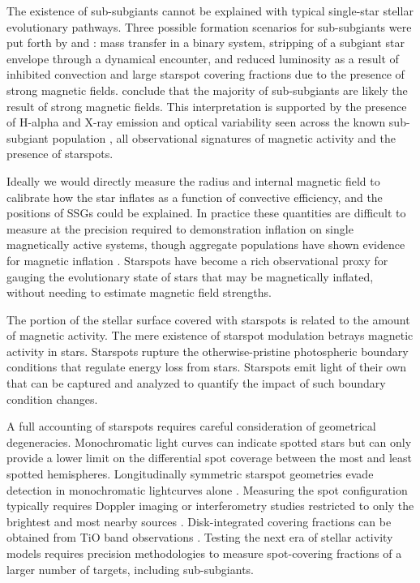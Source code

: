 \documentclass[modern,trackchanges]{aastex631}
\begin{document}
The existence of sub-subgiants cannot be explained with typical single-star stellar evolutionary pathways. Three possible formation scenarios for sub-subgiants were put forth by \citet{geller17} and \citet{leiner17}: mass transfer in a binary system, stripping of a subgiant star envelope through a dynamical encounter, and reduced luminosity as a result of inhibited convection and large starspot covering fractions due to the presence of strong magnetic fields. \citet{leiner17} conclude that the majority of sub-subgiants are likely the result of strong magnetic fields. This interpretation is supported by the presence of H-alpha and X-ray emission and optical variability seen across the known sub-subgiant population \citep{geller17}, all observational signatures of magnetic activity and the presence of starspots. 

Ideally we would directly measure the radius and internal magnetic field to calibrate how the star inflates as a function of convective efficiency, and the positions of SSGs could be explained.  In practice these quantities are difficult to measure at the precision required to demonstration inflation on single magnetically active systems, though aggregate populations have shown evidence for magnetic inflation \citep{2018AJ....155..225K,2018MNRAS.476.3245J}. Starspots have become a rich observational proxy for gauging the evolutionary state of stars that may be magnetically inflated, without needing to estimate magnetic field strengths.

The portion of the stellar surface covered with starspots is related to the amount of magnetic activity. The mere existence of starspot modulation betrays magnetic activity in stars.  Starspots rupture the otherwise-pristine photospheric boundary conditions that regulate energy loss from stars.  Starspots emit light of their own that can be captured and analyzed to quantify the impact of such boundary condition changes.  

A full accounting of starspots requires careful consideration of geometrical degeneracies.  Monochromatic light curves can indicate spotted stars \citep{2014ApJS..211...24M} but can only provide a lower limit on the differential spot coverage between the most and least spotted hemispheres. Longitudinally symmetric starspot geometries evade detection in monochromatic lightcurves alone \citep{2019AJ....157...64L}. Measuring the spot configuration typically requires Doppler imaging or interferometry studies restricted to only the brightest and most nearby sources \citep{roettenbacher16}.  Disk-integrated covering fractions can be obtained from TiO band observations \citep{oneal96,fang2016,2019AJ....158..101M}. Testing the next era of stellar activity models requires precision methodologies to measure spot-covering fractions of a larger number of targets, including sub-subgiants. 
\end{document}
